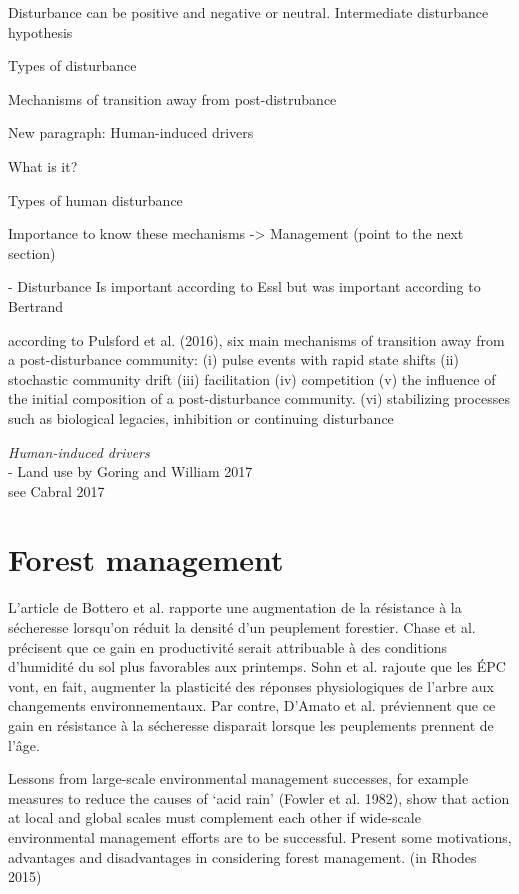 Disturbance can be positive and negative or neutral. Intermediate disturbance hypothesis

Types of disturbance

Mechanisms of transition away from post-distrubance

New paragraph: Human-induced drivers

What is it?

Types of human disturbance

Importance to know these mechanisms -> Management (point to the next section)


- Disturbance
Is important according to Essl but was important according to Bertrand

according to Pulsford et al. (2016), six main mechanisms of transition away from a post-disturbance community:
(i) pulse events with rapid state shifts
(ii) stochastic community drift
(iii) facilitation
(iv) competition
(v) the influence of the initial composition of a post-disturbance community.
(vi) stabilizing processes such as biological legacies, inhibition or continuing disturbance


\textit{Human-induced drivers} \\
- Land use by Goring and William 2017 \\
see Cabral 2017

\section{Forest management}

 L’article de Bottero et al. rapporte une augmentation de la résistance à la sécheresse lorsqu’on réduit la densité d’un peuplement forestier. Chase et al. précisent que ce gain en productivité serait attribuable à des conditions d’humidité du sol plus favorables aux printemps.  Sohn et al. rajoute que les ÉPC vont, en fait, augmenter la plasticité des réponses physiologiques de l’arbre aux changements environnementaux.  Par contre, D’Amato et al. préviennent que ce gain en résistance à la sécheresse disparait lorsque les peuplements prennent de l’âge.

Lessons from large-scale environmental management successes, for example measures to reduce the causes of ‘acid rain’ (Fowler et al. 1982), show that action at local and global scales must complement each other if wide-scale environmental management efforts are to be successful.
Present some motivations, advantages and disadvantages in considering forest management. (in Rhodes 2015)

